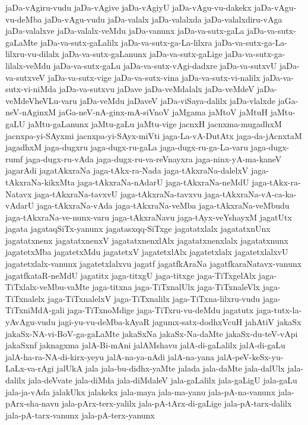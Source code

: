 {jaDa-vAgiru-vudu
jaDa-vAgive
jaDa-vAgiyU
jaDa-vAgu-vu-dakekx
jaDa-vAgu-vu-deMba
jaDa-vAgu-vudu
jaDa-valalx
jaDa-valalxda
jaDa-valalxdiru-vAga
jaDa-valalxve
jaDa-valalx-veMdu
jaDa-vanunx
jaDa-va-sutx-gaLa
jaDa-va-sutx-gaLaMte
jaDa-va-sutx-gaLalilx
jaDa-va-sutx-ga-La-lilxra
jaDa-va-sutx-ga-La-lilxru-vu-dilalx
jaDa-va-sutx-gaLanunx
jaDa-va-sutx-gaLige
jaDa-va-sutx-ga-lilalx-veMdu
jaDa-va-sutx-gaLu
jaDa-va-sutx-vAgi-dadxre
jaDa-va-sutxvU
jaDa-va-sutxveV
jaDa-va-sutx-vige
jaDa-va-sutx-vina
jaDa-va-sutx-vi-nalilx
jaDa-va-sutx-vi-niMda
jaDa-va-sutxvu
jaDave
jaDa-veMdalalx
jaDa-veMdeV
jaDa-veMdeVheVLu-varu
jaDa-veMdu
jaDaveV
jaDa-viSaya-dalilx
jaDa-vlalxde
jaGa-neV-nAginxM
jaGa-neV-nA-ginx-mA-siVnoV
jaMgama
jaMtoV
jaMtuH
jaMtu-gaLU
jaMtu-gaLanunx
jaMtu-gaLu
jaMtu-vige
jacnxH
jacnxma-mugadhxM
jacnxpa-yi-SAyxmi
jacnxpa-yi-SAyx-miVti
jaga-La-vA-DutAtx
jaga-da-jAcnxtaM
jagadhxM
jaga-dugxru
jaga-dugx-ru-gaLa
jaga-dugx-ru-ga-La-varu
jaga-dugx-rumf
jaga-dugx-ru-vAda
jaga-dugx-ru-va-reVnayxra
jaga-ninx-yA-ma-kaneV
jagarAdi
jagatAkxraNa
jaga-tAkx-ra-Nada
jaga-tAkxraNa-dalelxV
jaga-tAkxraNa-kikxMta
jaga-tAkxraNa-nAdarU
jaga-tAkxraNa-neMdU
jaga-tAkx-ra-Natavx
jaga-tAkxraNa-tavxvU
jaga-tAkxraNa-tavxvu
jaga-tAkxraNa-vA-ca-ka-vAdarU
jaga-tAkxraNa-vAda
jaga-tAkxraNa-veMba
jaga-tAkxraNa-veMbudu
jaga-tAkxraNa-ve-nunx-varu
jaga-tAkxraNavu
jaga-tAyx-veYshayxM
jagatUtx
jagata
jagataqSiTx-yanunx
jagatasxqq-SiTxge
jagatatxlalx
jagatatxnUnx
jagatatxnenx
jagatatxnenxV
jagatatxnenxlAlx
jagatatxnenxlalx
jagatatxnunx
jagatetxMba
jagatetxMdu
jagatetxV
jagatetxlAlx
jagatetxlalx
jagatetxlalxvU
jagatetxlalx-vanunx
jagatetxlalxvu
jagatf
jagatfkAraNa
jagatfkaraNatavx-vanunx
jagatfkataR-neMdU
jagatitx
jaga-titxgU
jaga-titxge
jaga-TiTxgelAlx
jaga-TiTxlalx-veMbu-vaMte
jaga-titxna
jaga-TiTxnalUlx
jaga-TiTxnaleVlx
jaga-TiTxnalelx
jaga-TiTxnalelxV
jaga-TiTxnalilx
jaga-TiTxna-lilxru-vudu
jaga-TiTxniMdA-gali
jaga-TiTxnoMdige
jaga-TiTxru-vu-deMdu
jagatutx
jaga-tutx-la-yAvAgu-vudu
jagi-yu-vu-deMba-kAyaR
jagumx-satx-dodhxVcuH
jahAtiV
jakaSx
jakaSx-NA-vi-BoV-ga-gaLaMte
jakaSxNa
jakaSx-Na-daMte
jakaSx-du-teV-vApi
jakaSxnf
jaknagxma
jalA-Bi-mAni
jalAMshavu
jalA-di-gaLalilx
jalA-di-gaLu
jalA-ha-ra-NA-di-kirx-yeyu
jalA-na-ya-nAdi
jalA-na-yana
jalA-peV-keSx-yu-LaLx-va-rAgi
jalUkA
jala
jala-bu-didhx-yaMte
jalada
jala-daMte
jala-dalUlx
jala-dalilx
jala-deVvate
jala-diMda
jala-diMdaleV
jala-gaLalilx
jala-gaLigU
jala-gaLu
jala-ja-vAda
jalakUkx
jalakekx
jala-maya
jala-ma-yanu
jala-pA-na-vanunx
jala-pArx-sha-navu
jala-pArx-terx-yalilx
jala-pA-tArx-di-gaLige
jala-pA-tarx-dalilx
jala-pA-tarx-vanunx
jala-pA-terx-yanunx
}
